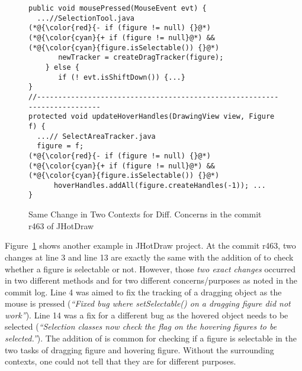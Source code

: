\begin{figure}[t]
	\centering
	\begin{lstlisting}[]
public void mousePressed(MouseEvent evt) { 
  ...//SelectionTool.java
(*@{\color{red}{- if (figure != null) {}@*)
(*@{\color{cyan}{+ if (figure != null}@*) && (*@{\color{cyan}{figure.isSelectable()) {}@*)
       newTracker = createDragTracker(figure);
    } else {
       if (! evt.isShiftDown()) {...}
}
//--------------------------------------------------------------------------
protected void updateHoverHandles(DrawingView view, Figure f) {
  ...// SelectAreaTracker.java
  figure = f;
(*@{\color{red}{- if (figure != null) {}@*)
(*@{\color{cyan}{+ if (figure != null}@*) && (*@{\color{cyan}{figure.isSelectable()) {}@*)
      hoverHandles.addAll(figure.createHandles(-1)); ...
}
	\end{lstlisting}
        \vspace{-15pt}
        \caption{Same Change in Two Contexts for Diff. Concerns in the commit r463 of JHotDraw}
        \vspace{-6pt}
        \label{fig:motiv-context}
\end{figure}

Figure~\ref{fig:motiv-context} shows another example in JHotDraw
project. At the commit r463, two changes at line 3 and line 13 are
exactly the same with the addition of  to
check whether a figure is selectable or not. However, those {\em two
  exact changes} occurred in two different methods 
and  for two different concerns/purposes as
noted in the commit log. Line 4 was aimed to fix the tracking of a
dragging object as the mouse is pressed ({\em ``Fixed bug where
  setSelectable() on a dragging figure did not work''}).  Line 14 was
a fix for a different bug as the hovered object needs to be selected
({\em ``Selection classes now check the flag on the hovering figures
  to be selected.''}). The addition of  is
common for checking if a figure is selectable in the two tasks of
dragging figure and hovering figure. Without the surrounding contexts,
one could not tell that they are for different purposes.

